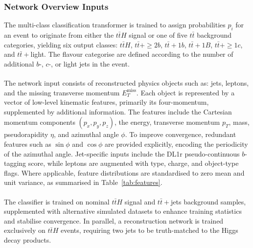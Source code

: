 \subsubsection{Network Overview Inputs}
The multi-class classification transformer is trained to assign probabilities $p_i$ for an event to originate from either the $t\bar{t}H$ signal or one of five $t\bar{t}$ background categories, yielding six output classes: $t\bar{t}H$, $t\bar{t}+\geq2b$, $t\bar{t}+1b$, $t\bar{t}+1B$, $t\bar{t}+\geq1c$, and $t\bar{t}+$light. The flavour categorise are defined according to the number of additional $b$-, $c$-, or light jets in the event.\\
\\
The network input consists of reconstructed physics objects such as: jets, leptons, and the missing transverse momentum $E_{T}^{\text{miss}}$. Each object is represented by a vector of low-level kinematic features, primarily its four-momentum, supplemented by additional information. The features include the Cartesian momentum components $(p_{x}, p_{y}, p_{z})$, the energy, transverse momentum $p_{T}$, mass, pseudorapidity $\eta$, and azimuthal angle $\phi$. To improve convergence, redundant features such as $\sin\phi$ and $\cos\phi$ are provided explicitly, encoding the periodicity of the azimuthal angle. Jet-specific inputs include the DL1r pseudo-continuous $b$-tagging score, while leptons are augmented with type, charge, and object-type flags. Where applicable, feature distributions are standardised to zero mean and unit variance, as summarised in Table~\ref{tab:features}.\\
\\
The classifier is trained on nominal $t\bar{t}H$ signal and $t\bar{t}+$jets background samples, supplemented with alternative simulated datasets to enhance training statistics and stabilise convergence. In parallel, a reconstruction network is trained exclusively on $t\bar{t}H$ events, requiring two jets to be truth-matched to the Higgs decay products.\\
\\
